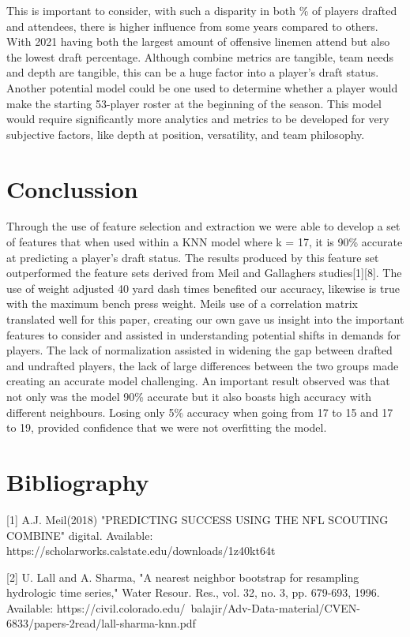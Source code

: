 \documentclass[confrence]{IEEEtran}
\begin{document}
This is important to consider, with such a disparity in both \% of players drafted and attendees, there is higher influence from some years compared to others.
With 2021 having both the largest amount of offensive linemen attend but also the lowest draft percentage.
Although combine metrics are tangible, team needs and depth are tangible, this can be a huge factor into a player's draft status.
Another potential model could be one used to determine whether a player would make the starting 53-player roster at the beginning of the season.
This model would require significantly more analytics and metrics to be developed for very subjective factors, like depth at position, versatility, and team philosophy.
\section*{Conclussion}
Through the use of feature selection and extraction we were able to develop a set of features that when used within a KNN model where k = 17, it is 90\% accurate at predicting a player's draft status.
The results produced by this feature set outperformed the feature sets derived from Meil and Gallaghers studies[1][8].
The use of weight adjusted 40 yard dash times benefited our accuracy, likewise is true with the maximum bench press weight.
Meils use of a correlation matrix translated well for this paper, creating our own gave us insight into the important features to consider and assisted in understanding potential shifts in demands for players.
The lack of normalization assisted in widening the gap between drafted and undrafted players, the lack of large differences between the two groups made creating an accurate model challenging.
An important result observed was that not only was the model 90\% accurate but it also boasts high accuracy with different neighbours.
Losing only 5\% accuracy when going from 17 to 15 and 17 to 19, provided confidence that we were not overfitting the model.

\section*{Bibliography}
[1] A.J. Meil(2018) "PREDICTING SUCCESS USING THE NFL SCOUTING COMBINE" digital. Available: https://scholarworks.calstate.edu/downloads/1z40kt64t

[2] U. Lall and A. Sharma, "A nearest neighbor bootstrap for resampling hydrologic time series," Water Resour. Res., vol. 32, no. 3, pp. 679-693, 1996. Available: https://civil.colorado.edu/~balajir/Adv-Data-material/CVEN-6833/papers-2read/lall-sharma-knn.pdf
\end{document}
